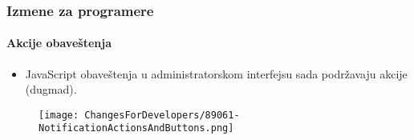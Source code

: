 %
%
%
%
%
%
%


\begin{frame}[fragile]
	\frametitle{Izmene za programere}
	\framesubtitle{Akcije obaveštenja}

	\begin{itemize}
		\item JavaScript obaveštenja u administratorskom interfejsu sada podržavaju
			akcije (dugmad).
	\end{itemize}

	\begin{figure}
		\texttt{[image: ChangesForDevelopers/89061-NotificationActionsAndButtons.png]}
	\end{figure}

\end{frame}


